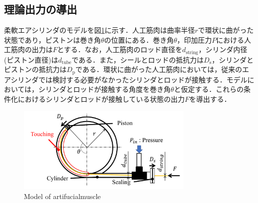 \subsection{理論出力の導出}%
柔軟エアシリンダのモデルを図\ref{Model of artifucialmuscle}に示す．人工筋肉は曲率半径$r$で環状に曲がった状態であり，ピストンは巻き角$\theta$の位置にある．巻き角$\theta$，印加圧力$P$における人工筋肉の出力は$F$とする．なお，人工筋肉のロッド直径を$d_\mathrm{string}$，シリンダ内径(ピストン直径)は$d_\mathrm{tube}$である．また，シールとロッドの抵抗力は$D_\mathrm{s}$，シリンダとピストンの抵抗力は$D_\mathrm{p}$である．環状に曲がった人工筋肉においては，従来のエアシリンダでは検討する必要がなかったシリンダとロッドが接触する．モデルにおいては，シリンダとロッドが接触する角度を巻き角$\theta$と仮定する．これらの条件化におけるシリンダとロッドが接触している状態の出力$F$を導出する．
\begin{figure}[t]
  \centering
  \includegraphics[width=85mm]{_pdf/model_artifucialmuscle.pdf}
  \caption{Model of artifucialmuscle}
  \label{Model of artifucialmuscle}
\end{figure}

